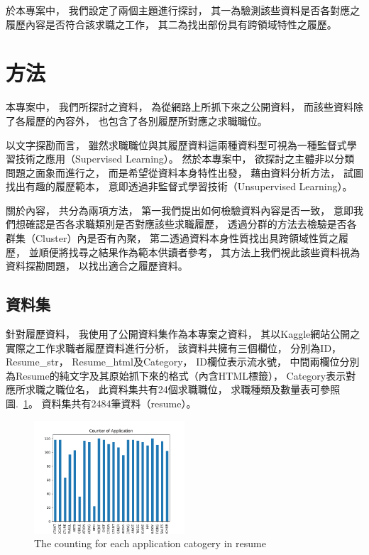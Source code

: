 \documentclass[acmsmall]{acmart}
\begin{document}
於本專案中，
我們設定了兩個主題進行探討，
其一為驗測該些資料是否各對應之履歷內容是否符合該求職之工作，
其二為找出部份具有跨領域特性之履歷。

\section{方法}

本專案中，
我們所探討之資料，
為從網路上所抓下來之公開資料，
而該些資料除了各履歷的內容外，
也包含了各別履歷所對應之求職職位。

以文字探勘而言，
雖然求職職位與其履歷資料這兩種資料型可視為一種監督式學習技術之應用（Supervised Learning）\cite{murphy2012machine}。
然於本專案中，
欲探討之主體非以分類問題之面象而進行之，
而是希望從資料本身特性出發，
藉由資料分析方法，
試圖找出有趣的履歷範本，
意即透過非監督式學習技術（Unsupervised Learning）\cite{murphy2012machine}。

關於內容，
共分為兩項方法，
第一我們提出如何檢驗資料內容是否一致，
意即我們想確認是否各求職類別是否對應該些求職履歷，
透過分群的方法去檢驗是否各群集（Cluster）內是否有內聚，
第二透過資料本身性質找出具跨領域性質之履歷，
並順便將找尋之結果作為範本供讀者參考，
其方法上我們視此該些資料視為資料探勘問題\cite{han2011data}，
以找出適合之履歷資料。

\subsection{資料集}

針對履歷資料，
我使用了公開資料集作為本專案之資料，
其以Kaggle網站公開之實際之工作求職者履歷資料進行分析\cite{kaggle_dataset}，
該資料共擁有三個欄位，
分別為ID，
Resume\_str，
Resume\_html及Category，
ID欄位表示流水號，
中間兩欄位分別為Resume的純文字及其原始抓下來的格式（內含HTML標籤），
Category表示對應所求職之職位名，
此資料集共有24個求職職位，
求職種類及數量表可參照圖.~\ref{counter_of_application}。
資料集共有2484筆資料（resume）。

\begin{figure}
    \centerline{\includegraphics[width=0.5\textwidth]{counter_of_application.png}}
    \caption{The counting for each application catogery in resume}
    \label{counter_of_application}
\end{figure}
\end{document}

